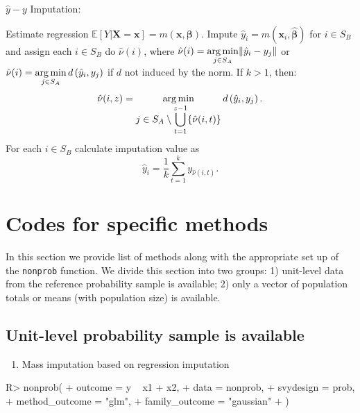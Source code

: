 \documentclass[
]{jss}
\providecommand{\tightlist}{%
  \setlength{\itemsep}{0pt}\setlength{\parskip}{0pt}}
\begin{document}
\begin{algorithm}[ht!]
\caption{$\hat{y}-y$ Imputation:}
\label{algo-4}
\begin{algorithmic}[1]
\State Estimate regression $\mathbb{E}[Y|\boldsymbol{X}=\boldsymbol{x}]=m(\boldsymbol{x}, \boldsymbol{\beta})$.\;
\State Impute $\hat{y}_{i}=m\left(\boldsymbol{x}_{i},\hat{\boldsymbol{\beta}}\right)$ 
for $i \in S_{B}$ and assign each 
$i \in S_{B}$ do $\hat{\nu}(i)$, where
$\displaystyle \hat{\nu}(i)=
\operatornamewithlimits{arg\,min}_{j \in S_{A}}\lVert \hat{y}_{i}-y_{j}\rVert$ or
$\displaystyle \hat{\nu}(i)=
\operatornamewithlimits{arg\,min}_{j \in S_{A}}d\left(\hat{y}_{i},y_{j}\right)$ 
if $d$ not induced by the norm.\;
\State If $k>1$, then:
$$\hat{\nu}(i, z) = \operatornamewithlimits{arg\,min}_{\displaystyle j \in S_{A} \setminus \bigcup_{t=1}^{z-1}
\{\hat{\nu}(i, t)\}}
d\left(\hat{y}_{i},y_{j}\right).$$
\State For each $i \in S_B$ calculate imputation value as
$$
\hat{y}_i = \frac{1}{k}\sum_{t=1}^{k}y_{\hat{\nu}(i, t)}.
$$
\end{algorithmic}
\end{algorithm}

\clearpage

\section{Codes for specific methods}\label{sec-examples}

In this section we provide list of methods along with the appropriate
set up of the \texttt{nonprob} function. We divide this section into two
groups: 1) unit-level data from the reference probability sample is
available; 2) only a vector of population totals or means (with
population size) is available.

\subsection{Unit-level probability sample is
available}\label{unit-level-probability-sample-is-available}

\begin{enumerate}
\def\labelenumi{\arabic{enumi}.}
\tightlist
\item
  Mass imputation based on regression imputation
\end{enumerate}

\begin{CodeChunk}
\begin{CodeInput}
R> nonprob(
+   outcome = y ~ x1 + x2, 
+   data = nonprob, 
+   svydesign = prob, 
+   method_outcome = "glm", 
+   family_outcome = "gaussian"
+ )
\end{CodeInput}
\end{CodeChunk}
\end{document}
